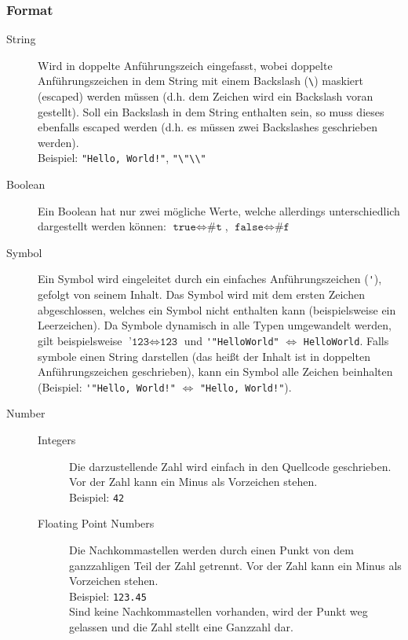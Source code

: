         \subsubsection{Format}
            \begin{description}
                \item[String] Wird in doppelte Anführungszeich eingefasst, wobei doppelte Anführungszeichen in dem String mit einem Backslash (\texttt{\textbackslash}) maskiert (escaped) werden müssen (d.h. dem Zeichen wird ein Backslash voran gestellt). Soll ein Backslash in dem String enthalten sein, so muss dieses ebenfalls escaped werden (d.h. es müssen zwei Backslashes geschrieben werden). \\ Beispiel: \verb$"Hello, World!"$, \verb$"\"\\"$
                \item[Boolean] Ein Boolean hat nur zwei mögliche Werte, welche allerdings unterschiedlich dargestellt werden können: $ \texttt{true} \iff \texttt{\#t} $, $ \texttt{false} \iff \texttt{\#f} $
                \item[Symbol] Ein Symbol wird eingeleitet durch ein einfaches Anführungszeichen (\verb$'$), gefolgt von seinem Inhalt. Das Symbol wird mit dem ersten Zeichen abgeschlossen, welches ein Symbol nicht enthalten kann (beispielsweise ein Leerzeichen). Da Symbole dynamisch in alle Typen umgewandelt werden, gilt beispielsweise $ \texttt{'123} \iff \texttt{123} $
                und \verb$'"HelloWorld"$ $ \iff $ \verb$HelloWorld$. Falls symbole einen String darstellen (das heißt der Inhalt ist in doppelten Anführungszeichen geschrieben), kann ein Symbol alle Zeichen beinhalten (Beispiel: \verb$'"Hello, World!"$ $ \iff $ \verb$"Hello, World!"$).
                \item[Number]
                    \begin{description}
                        \item[Integers] Die darzustellende Zahl wird einfach in den Quellcode geschrieben. Vor der Zahl kann ein Minus als Vorzeichen stehen. \\ Beispiel: \texttt{42}
                        \item[Floating Point Numbers] Die Nachkommastellen werden durch einen Punkt von dem ganzzahligen Teil der Zahl getrennt. Vor der Zahl kann ein Minus als Vorzeichen stehen. \\ Beispiel: \texttt{123.45} \\ Sind keine Nachkommastellen vorhanden, wird der Punkt weg gelassen und die Zahl stellt eine Ganzzahl dar.

\end{description}
\end{description}
